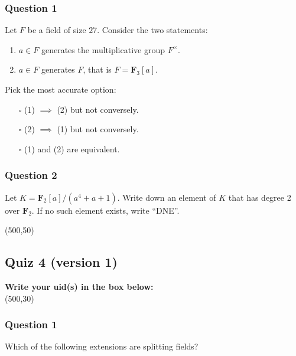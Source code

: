 \documentclass[11pt]{article}
\begin{document}
\subsubsection{Question 1}
\label{sec:org82e7d90}

Let \(F\) be a field of size \(27\).  Consider the two statements:
\begin{enumerate}
\item \(a \in F\) generates the multiplicative group \(F^{\times}\).
\item \(a \in F\) generates \(F\), that is \(F = \mathbf{F}_3[a]\).
\end{enumerate}

Pick the most accurate option:\\

\begin{itemize}
\item[{$\square$}] (1) \(\implies\) (2) but not conversely.\\

\item[{$\square$}] (2) \(\implies\) (1) but not conversely.\\

\item[{$\square$}] (1) and (2) are equivalent.
\end{itemize}
\subsubsection{Question 2}
\label{sec:org61daa68}

Let \(K = \mathbf{F}_2[a]/(a^4+a+1)\).
Write down an element of \(K\) that has degree 2 over \(\mathbf{F}_2\).
If no such element exists, write ``DNE''.

\noindent
\framebox(500,50)

\vspace{3cm}
\subsection{Quiz 4 (version 1)}
\label{sec:orge69ba36}
\vspace{1cm}

\noindent
\textbf{Write your uid(s) in the box below:}\\
\framebox(500,30)

\vspace{1cm}
\subsubsection{Question 1}
\label{sec:orge19614e}
Which of the following extensions are splitting fields?
\end{document}
